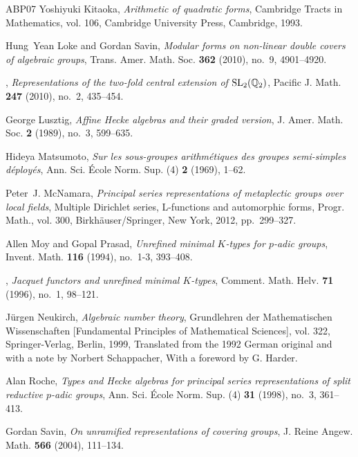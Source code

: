 \documentclass[10pt, letterpaper]{amsart}
\theoremstyle{plain}
\theoremstyle{definition}
\numberwithin{equation}{section}
\begin{document}
\begin{thebibliography}{ABP{\etalchar{+}}07}
Yoshiyuki Kitaoka, \emph{Arithmetic of quadratic forms}, Cambridge Tracts in
  Mathematics, vol. 106, Cambridge University Press, Cambridge, 1993.

Hung~Yean Loke and Gordan Savin, \emph{Modular forms on non-linear double
  covers of algebraic groups}, Trans. Amer. Math. Soc. \textbf{362} (2010),
  no.~9, 4901--4920.

\bysame, \emph{Representations of the two-fold central extension of {${\rm
  SL}_2(\Bbb Q_2)$}}, Pacific J. Math. \textbf{247} (2010), no.~2, 435--454.

George Lusztig, \emph{Affine {H}ecke algebras and their graded version}, J.
  Amer. Math. Soc. \textbf{2} (1989), no.~3, 599--635.

Hideya Matsumoto, \emph{Sur les sous-groupes arithm\'{e}tiques des groupes
  semi-simples d\'{e}ploy\'{e}s}, Ann. Sci. \'{E}cole Norm. Sup. (4) \textbf{2}
  (1969), 1--62.

Peter~J. McNamara, \emph{Principal series representations of metaplectic groups
  over local fields}, Multiple {D}irichlet series, {L}-functions and
  automorphic forms, Progr. Math., vol. 300, Birkh\"{a}user/Springer, New York,
  2012, pp.~299--327.

Allen Moy and Gopal Prasad, \emph{Unrefined minimal {$K$}-types for {$p$}-adic
  groups}, Invent. Math. \textbf{116} (1994), no.~1-3, 393--408.

\bysame, \emph{Jacquet functors and unrefined minimal {$K$}-types}, Comment.
  Math. Helv. \textbf{71} (1996), no.~1, 98--121.

J\"{u}rgen Neukirch, \emph{Algebraic number theory}, Grundlehren der
  Mathematischen Wissenschaften [Fundamental Principles of Mathematical
  Sciences], vol. 322, Springer-Verlag, Berlin, 1999, Translated from the 1992
  German original and with a note by Norbert Schappacher, With a foreword by G.
  Harder.

Alan Roche, \emph{Types and {H}ecke algebras for principal series
  representations of split reductive {$p$}-adic groups}, Ann. Sci. \'Ecole
  Norm. Sup. (4) \textbf{31} (1998), no.~3, 361--413.

Gordan Savin, \emph{On unramified representations of covering groups}, J. Reine
  Angew. Math. \textbf{566} (2004), 111--134. 


\end{thebibliography}
\end{document}

